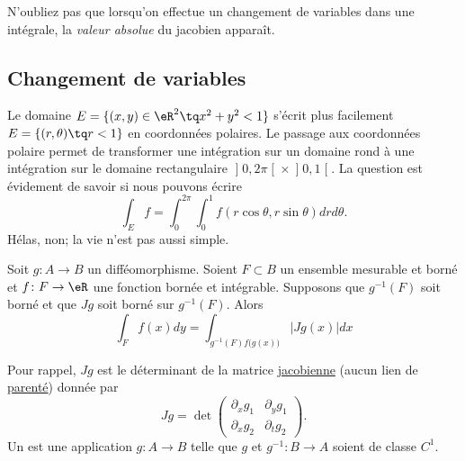 N'oubliez pas que lorsqu'on effectue un changement de variables dans une intégrale, la \emph{valeur absolue} du jacobien apparaît.

					\subsection{Changement de variables}

Le domaine $E=\{ (x,y)\in\eR^2\tq x^2+y^2<1 \}$ s'écrit plus facilement $E=\{ (r,\theta)\tq r<1 \}$ en coordonnées polaires. Le passage aux coordonnées polaire permet de transformer une intégration sur un domaine rond à une intégration sur le domaine rectangulaire $\mathopen]0,2\pi\mathclose[\times\mathopen]0,1\mathclose[$. La question est évidement de savoir si nous pouvons écrire
\begin{equation}
	\int_Ef=\int_{0}^{2\pi}\int_0^1f(r\cos\theta,r\sin\theta)drd\theta.
\end{equation}
Hélas, non; la vie n'est pas aussi simple.

\begin{theorem}
Soit $g\colon A\to B$ un difféomorphisme. Soient $F\subset B$ un ensemble mesurable et borné et $f\colon F\to \eR$ une fonction bornée et intégrable. Supposons que $g^{-1}(F)$ soit borné et que $Jg$ soit borné sur $g^{-1}(F)$. Alors
\begin{equation}
	\int_Ff(x)dy=\int_{g^{-1}(F)f\big( g(x) \big)}| Jg(x) |dx
\end{equation}
\end{theorem}
Pour rappel, $Jg$ est le déterminant de la matrice \href{http://fr.wikipedia.org/wiki/Matrice_jacobienne}{jacobienne} (aucun lien de \href{http://fr.wikipedia.org/wiki/Jacob}{parenté}) donnée par
\begin{equation}
	Jg=\det\begin{pmatrix}
	\partial_xg_1	&	\partial_yg_1	\\ 
	\partial_xg_2	&	\partial_tg_2	
\end{pmatrix}.
\end{equation}
Un  est une application $g\colon A\to B$ telle que $g$ et $g^{-1}\colon B\to A$ soient de classe $C^1$.

